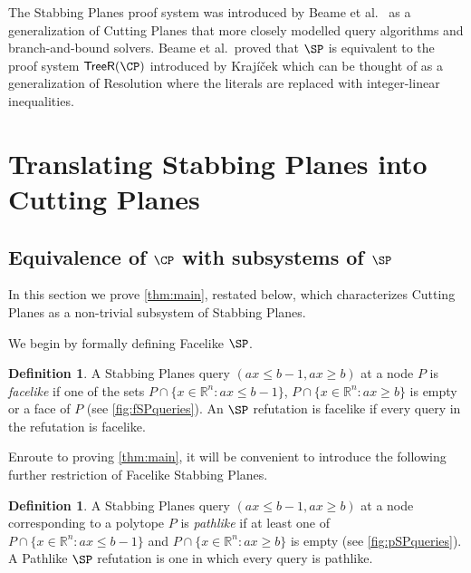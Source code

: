 \documentclass[11pt]{article}
\numberwithin{equation}{section}
\theoremstyle{definition}
\newtheorem{definition}[theorem]{Definition}
\theoremstyle{plain}
\newcounter{cor}\renewcommand{\thecor}{1.1.\arabic{cor}}\newenvironment{cor}{\ifnum\value{cor}=0\refstepcounter{cor}\else\PackageError{toc-native-compat}{Unsupported additional cor envelope}{Only the one exact source-observed cor paragraph is allowed.}\fi}{}\providecommand{\corautorefname}{Theorem}
\begin{document}
The Stabbing Planes proof system was introduced by Beame et al.~\cite{BeameFIKPPR18} as a generalization of Cutting Planes that more closely modelled query algorithms and branch-and-bound solvers.
Beame et al.~proved that $\SP$ is equivalent to the proof system $\mathsf{TreeR}(\CP)$ introduced by Kraj\'{i}\v{c}ek \cite{Krajicek98} which can be thought of as a generalization of Resolution where the literals are replaced with integer-linear inequalities.






\section{Translating Stabbing Planes into Cutting Planes} 
\label{sec:SP}

\subsection{Equivalence of \texorpdfstring{$\CP$}{CP} with subsystems of
  \texorpdfstring{$\SP$}{SP}}
\label{sec:facelikesp-sim}

In this section we prove \autoref{thm:main}, restated below, which characterizes Cutting Planes as a non-trivial subsystem of Stabbing Planes.

\main*

We begin by formally defining Facelike $\SP$.
\begin{definition}
	A Stabbing Planes query $(ax \leq b-1, ax \geq b)$ at a node $P$ is \emph{facelike} if one of the sets $P \cap \{x \in \mathbb{R}^n: ax \leq b-1\}$, $P \cap \{x \in \mathbb{R}^n: ax \geq b\}$ is empty or a face of $P$ (see \autoref{fig:fSPqueries}).
	An $\SP$ refutation is facelike if every query in the refutation is facelike. 
\end{definition}

Enroute to proving \autoref{thm:main}, it will be convenient to introduce the following further restriction of Facelike Stabbing Planes.

\begin{definition}
	A Stabbing Planes query $(ax \leq b-1, ax \geq b)$ at a node corresponding to a polytope $P$ is \emph{pathlike} if at least one of $P \cap \{x \in \mathbb{R}^n: ax \leq b-1\}$ and $P \cap \{x \in \mathbb{R}^n: ax \geq b\}$ is empty (see \autoref{fig:pSPqueries}). A Pathlike $\SP$ refutation is one in which every query is pathlike. 
\end{definition}
\end{document}
